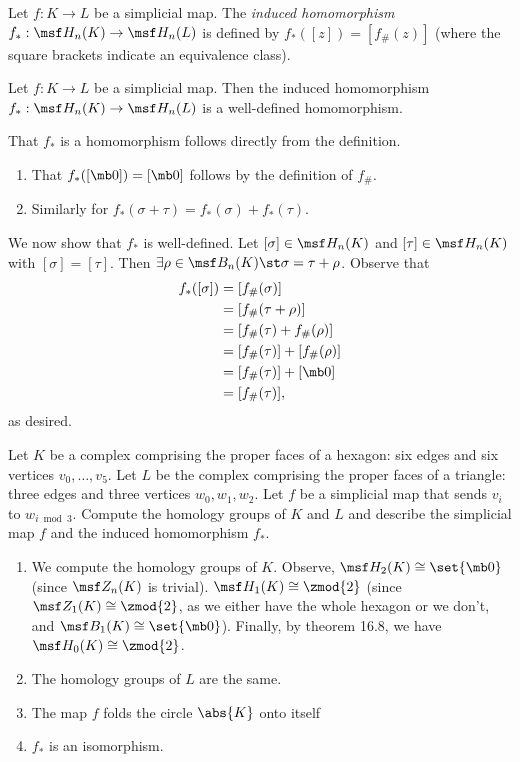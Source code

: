 \begin{definition}
  Let $f : K \to L$ be a simplicial map. The \emph{induced homomorphism} $f_* :
  \msf H_n(K) \to \msf H_n(L)$ is defined by $f_*([z]) = [f_\#(z)]$ (where the
  square brackets indicate an equivalence class).
\end{definition}
\begin{problem}[16.17]
  Let $f : K \to L$ be a simplicial map. Then the induced homomorphism $f_* :
  \msf H_n(K) \to \msf H_n(L)$ is a well-defined homomorphism.
\end{problem}
\begin{solution}
  That $f_*$ is a homomorphism follows directly from the definition.
  \begin{enumerate}[label=(\arabic*)]
  \item That $f_*([\mb 0]) = [\mb 0]$ follows by the definition of $f_{\#}$.
  \item Similarly for $f_*(\sigma + \tau) = f_*(\sigma) + f_*(\tau)$.
  \end{enumerate}
  We now show that $f_*$ is well-defined. Let $[\sigma] \in \msf H_n(K)$ and
  $[\tau] \in \msf H_n(K)$ with $[\sigma] = [\tau]$. Then $\exists \rho \in \msf
  B_n(K) \st \sigma = \tau + \rho$. Observe that
  \begin{align*}
    f_*([\sigma])
    &= [f_{\#}(\sigma)] \\
    &= [f_{\#}(\tau + \rho)] \\
    &= [f_{\#}(\tau) + f_{\#}(\rho)] \\
    &= [f_{\#}(\tau)] + [f_{\#}(\rho)] \\
    &= [f_{\#}(\tau)] + [\mb 0] \\
    &= [f_{\#}(\tau)],
  \end{align*}
  as desired.
\end{solution}
\begin{problem}[16.18]
  Let $K$ be a complex comprising the proper faces of a hexagon: six edges and
  six vertices $v_0, \ldots, v_5$. Let $L$ be the complex comprising the proper
  faces of a triangle: three edges and three vertices $w_0, w_1, w_2$. Let $f$
  be a simplicial map that sends $v_i$ to $w_{i \bmod 3}$. Compute the homology
  groups of $K$ and $L$ and describe the simplicial map $f$ and the induced
  homomorphism $f_*$.
\end{problem}
\begin{solution}
  \begin{enumerate}[label=(\arabic*)]
  \item We compute the homology groups of $K$. Observe, $\msf H_2(K) \cong
    \set{\mb 0}$ (since $\msf Z_n(K)$ is trivial). $\msf H_1(K) \cong
    \zmod{2}$ (since $\msf Z_1(K) \cong \zmod{2}$, as we either have the whole
    hexagon or we don't, and $\msf B_1(K) \cong \set{\mb 0}$). Finally, by
    theorem 16.8, we have $\msf H_0(K) \cong \zmod{2}$.
  \item The homology groups of $L$ are the same.
  \item The map $f$ folds the circle $\abs{K}$ onto itself
  \item $f_*$ is an isomorphism.
  \end{enumerate}
\end{solution}
